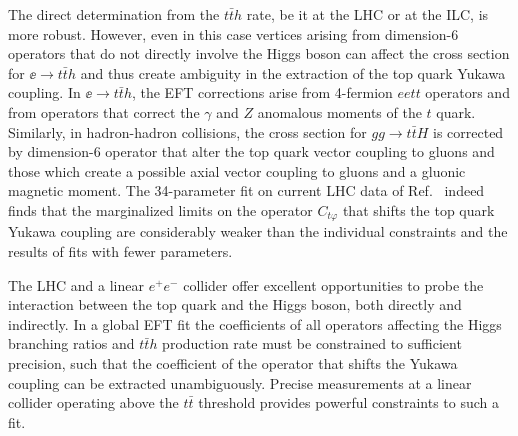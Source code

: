 The direct determination from the $t\bar{t}h$ rate, be it at the LHC
or at the ILC, is more robust. However, even in this case
vertices arising from dimension-6 operators
that do not directly involve the Higgs boson can affect the cross
section for $\ee\to t\bar t h$ and thus create ambiguity in the
extraction of the top quark Yukawa coupling. In $\ee \rightarrow t\bar t h$,
the EFT corrections arise from 4-fermion $eett$ operators and from
operators that correct the $\gamma$ and $Z$ anomalous moments of the
$t$ quark. Similarly, in hadron-hadron collisions, the cross section
for $gg\to t\bar t H$ is corrected by dimension-6 operator that alter
the top quark vector coupling to gluons and those which create a
possible axial vector coupling to gluons and a gluonic magnetic
moment. The 34-parameter fit on current LHC data of Ref.~\cite{Hartland:2019bjb} 
indeed finds that the marginalized limits on the operator $C_{t \varphi}$
that shifts the top quark Yukawa coupling are considerably weaker 
than the individual constraints and the results of fits with fewer parameters.

The LHC and a linear $e^+e^-$ collider offer excellent opportunities
to probe the interaction between the top quark and the Higgs boson, both
directly and indirectly. In a global EFT fit the coefficients of all operators 
affecting the Higgs branching ratios and $t\bar{t}h$ production rate must be 
constrained to sufficient precision, such that the coefficient of the operator that 
shifts the Yukawa coupling can be extracted unambiguously. Precise measurements at
a linear collider operating above the $t\bar{t}$ threshold provides powerful
constraints to such a fit.